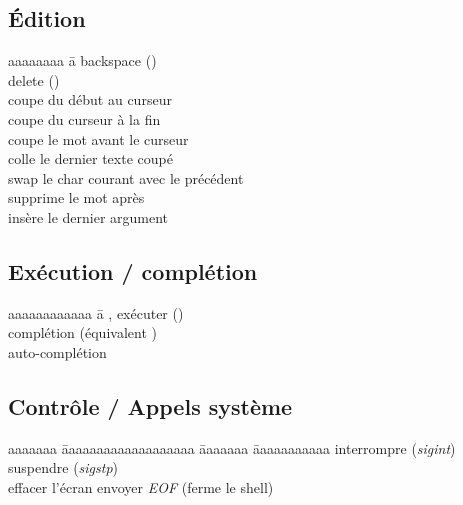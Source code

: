\documentclass{article}
\let\oldkeys\keys
\renewcommand{\keys}[1]{\small\oldkeys{#1}\normalsize}
\begin{document}
\begin{multicols}{4}
    \subsection*{Édition}

    \begin{tabbing}
        aaaaaaaa \= a \kill
         \> backspace (\keys{\backspace})    \\
         \> delete (\keys{\del})             \\
         \> coupe du début au curseur              \\
         \> coupe du curseur à la fin              \\
         \> coupe le mot avant le curseur          \\
         \> colle le dernier texte coupé           \\
         \> swap le char courant avec le précédent \\
          \> supprime le mot après                  \\
          \> insère le dernier argument
    \end{tabbing}

    \subsection*{Exécution / complétion}

    \begin{tabbing}
        aaaaaaaaaaaa \= a \kill
        ,  exécuter (\keys{\return}) \\
         \> complétion (équivalent \keys{\tab})                           \\
        \keys{\tab}{}    \> auto-complétion
    \end{tabbing}

    \subsection*{Contrôle / Appels système}

    \setlength{\columnseprule}{0pt}

    \begin{tabbing}
        aaaaaaa \= aaaaaaaaaaaaaaaaaaa \= aaaaaaa \= aaaaaaaaaaa \kill
         \> interrompre (\emph{sigint}) \>  \> suspendre (\emph{sigstp}) \\
         \> effacer l'écran \>
         \> envoyer \emph{EOF} (ferme le shell)
    \end{tabbing}


\end{multicols}
\end{document}
